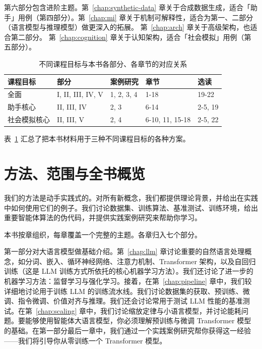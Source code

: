 第六部分包含进阶主题。第~\ref{chap:synthetic-data} 章关于合成数据生成，适合「助手」用例（第四部分）。第~\ref{chap:mi} 章关于机制可解释性，适合为第一、二部分（语言模型与推理模型）做更深入的拓展。
第~\ref{chap:arch} 章关于高级架构，也适合第二部分。
第~\ref{chap:cognition} 章关于认知架构，适合「社会模拟」用例（第五部分）。

\begin{table}
    \centering
    \begin{tabular}{l|l|l|l|l}
        课程目标 & 部分 & 案例研究& 章节 & 选读  \\ \hline
        全面 & I, II, III, IV, V & 1, 2, 3, 4 & 1-18 & 19-22\\
        助手核心 & II, III, IV & 2, 3 & 6-14 & 2-5, 19\\
        社会模拟核心 & II, III, V & 2, 4 & 6-10, 11, 15-18 & 2-5, 22\\
    \end{tabular}
    \caption{不同课程目标与本书各部分、各章节的对应关系}
    \label{tab:flow}
\end{table}

表~\ref{tab:flow} 汇总了把本书材料用于三种不同课程目标的各种方案。


\section{方法、范围与全书概览}
我们的方法是动手实践式的。对所有新概念，我们都提供理论背景，并给出在实践中如何使用它们的例子。我们讨论数据集、训练算法、基准测试、训练环境，给出重要智能体算法的伪代码，并提供实践案例研究来帮助你学习。

本书按章组织，每章覆盖一个完整的主题。各章归入七个部分。

第一部分对大语言模型做基础介绍。第~\ref{chap:llm} 章讨论重要的自然语言处理概念，如分词、嵌入、循环神经网络、注意力机制、Transformer 架构，以及自回归训练（这是 LLM 训练方式所依托的核心机器学习方法）。我们还讨论了进一步的机器学习方法：监督学习与强化学习。接着，在第~\ref{chap:pipeline} 章中，我们较详细地讨论用于训练 LLM 的训练流水线。我们讨论数据集的获取、预训练、微调、指令微调、价值对齐与推理。我们还会讨论常用于测试 LLM 性能的基准测试。在第~\ref{chap:scaling} 章中，我们讨论缩放定律与小语言模型，并讨论能耗问题。要能够使用智能体大语言模型，你必须理解预训练与微调 Transformer 模型的基础。在第一部分最后一章中，我们通过一个实践案例研究帮你获得这一经验——我们将引导你从零训练一个 Transformer 模型。

